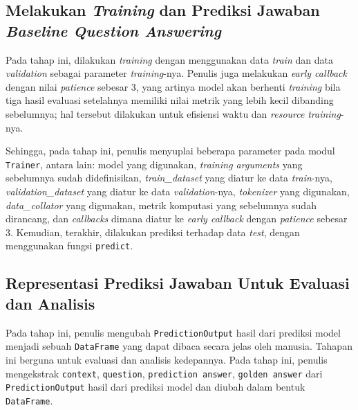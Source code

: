\subsection{Melakukan \emph{Training} dan Prediksi Jawaban \emph{Baseline Question Answering}}
Pada tahap ini, dilakukan \emph{training} dengan menggunakan data \emph{train} dan data \emph{validation} sebagai parameter \emph{training}-nya. Penulis juga melakukan \emph{early callback} dengan nilai \emph{patience} sebesar 3, yang artinya model akan berhenti \emph{training} bila tiga hasil evaluasi setelahnya memiliki nilai metrik yang lebih kecil dibanding sebelumnya; hal tersebut dilakukan untuk efisiensi waktu dan \emph{resource} \emph{training}-nya. 

Sehingga, pada tahap ini, penulis menyuplai beberapa parameter pada modul \texttt{Trainer}, antara lain: model yang digunakan, \emph{training arguments} yang sebelumnya sudah didefinisikan, \emph{train\_dataset} yang diatur ke data \emph{train}-nya, \emph{validation\_dataset} yang diatur ke data \emph{validation}-nya, \emph{tokenizer} yang digunakan, \emph{data\_collator} yang digunakan, metrik komputasi yang sebelumnya sudah dirancang, dan \emph{callbacks} dimana diatur ke \emph{early callback} dengan \emph{patience} sebesar 3. Kemudian, terakhir, dilakukan prediksi terhadap data \emph{test}, dengan menggunakan fungsi \texttt{predict}.

\subsection{Representasi Prediksi Jawaban Untuk Evaluasi dan Analisis}
Pada tahap ini, penulis mengubah \texttt{PredictionOutput} hasil dari prediksi model menjadi sebuah \texttt{DataFrame} yang dapat dibaca secara jelas oleh manusia. Tahapan ini berguna untuk evaluasi dan analisis kedepannya. Pada tahap ini, penulis mengekstrak \texttt{context}, \texttt{question}, \texttt{prediction answer}, \texttt{golden answer} dari \texttt{PredictionOutput} hasil dari prediksi model dan diubah dalam bentuk \texttt{DataFrame}. 

